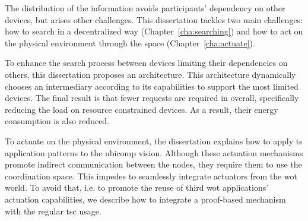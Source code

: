 The distribution of the information avoids participants' dependency on other devices, but arises other challenges.
This dissertation tackles two main challenges: how to search in a decentralized way (Chapter~\ref{cha:searching}) and how to act on the physical environment through the space (Chapter~\ref{cha:actuate}).


To enhance the search process between devices limiting their dependencies on others, this dissertation proposes an architecture.
This architecture dynamically chooses an intermediary according to its capabilities to support the most limited devices.
The final result is that fewer requests are required in overall, specifically reducing the load on resource constrained devices.
As a result, their energy consumption is also reduced.


To actuate on the physical environment, the dissertation explains how to apply \ac{ts} application patterns to the \ac{ubicomp} vision.
Although these actuation mechanisms promote indirect communication between the nodes, they require them to use the coordination space.
This impedes to seamlessly integrate actuators from the \ac{wot} world. %
To avoid that, i.e. to promote the reuse of third \ac{wot} applications' actuation capabilities, we describe how to integrate a proof-based mechanism with the regular \ac{tsc} usage.







